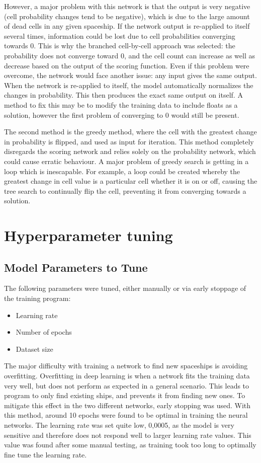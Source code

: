 \documentclass{l4proj}
\begin{document}
However, a major problem with this network is that the output is very negative (cell probability changes tend to be negative), which is due to the large amount of dead cells in any given spaceship. If the network output is re-applied to itself several times, information could be lost due to cell probabilities converging towards 0. This is why the branched cell-by-cell approach was selected: the probability does not converge toward 0, and the cell count can increase as well as decrease based on the output of the scoring function. Even if this problem were overcome, the network would face another issue: any input gives the same output. When the network is re-applied to itself, the model automatically normalizes the changes in probability. This then produces the exact same output on itself. A method to fix this may be to modify the training data to include floats as a solution, however the first problem of converging to 0 would still be present.

The second method is the greedy method, where the cell with the greatest change in probability is flipped, and used as input for iteration. This method completely disregards the scoring network and relies solely on the probability network, which could cause erratic behaviour. A major problem of greedy search is getting in a loop which is inescapable. For example, a loop could be created whereby the greatest change in cell value is a particular cell whether it is on or off, causing the tree search to continually flip the cell, preventing it from converging towards a solution. 


\section{Hyperparameter tuning}

\subsection{Model Parameters to Tune}

The following parameters were tuned, either manually or via early stoppage of the training program:
\begin{itemize}
    \item Learning rate
    \item Number of epochs
    \item Dataset size
\end{itemize}

The major difficulty with training a network to find new spaceships is avoiding overfitting. Overfitting in deep learning is when a network fits the training data very well, but does not perform as expected in a general scenario. This leads to program to only find existing ships, and prevents it from finding new ones. To mitigate this effect in the two different networks, early stopping was used. With this method, around 10 epochs were found to be optimal in training the neural networks. The learning rate was set quite low, 0,0005, as the model is very sensitive and therefore does not respond well to larger learning rate values. This value was found after some manual testing, as training took too long to optimally fine tune the learning rate.
\end{document}
